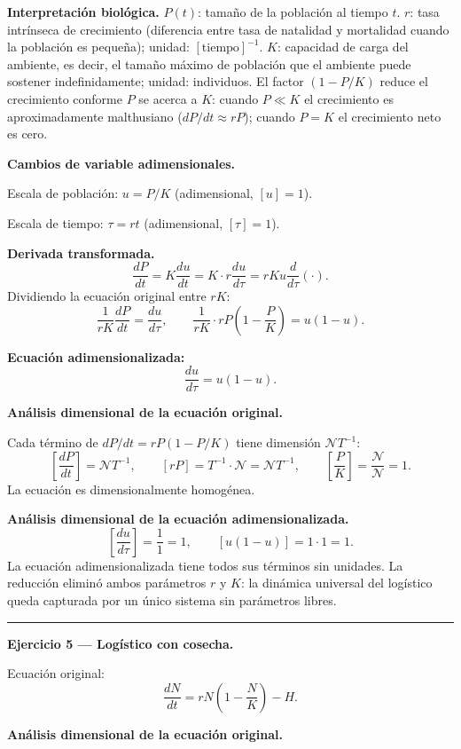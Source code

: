 \documentclass[12pt,letterpaper]{article}
\begin{document}
\textbf{Interpretación biológica.}
$P(t)$: tamaño de la población al tiempo $t$.
$r$: tasa intrínseca de crecimiento (diferencia entre tasa de natalidad y mortalidad
cuando la población es pequeña); unidad: $[\text{tiempo}]^{-1}$.
$K$: capacidad de carga del ambiente, es decir, el tamaño máximo de población
que el ambiente puede sostener indefinidamente; unidad: individuos.
El factor $(1-P/K)$ reduce el crecimiento conforme $P$ se acerca a $K$:
cuando $P\ll K$ el crecimiento es aproximadamente malthusiano ($dP/dt\approx rP$);
cuando $P=K$ el crecimiento neto es cero.

\textbf{Cambios de variable adimensionales.}

Escala de población: $u=P/K$ (adimensional, $[u]=1$).

Escala de tiempo: $\tau=rt$ (adimensional, $[\tau]=1$).

\textbf{Derivada transformada.}
\[
  \frac{dP}{dt}=K\frac{du}{dt}=K\cdot r\frac{du}{d\tau}=rKu\frac{d}{d\tau}(\cdot).
\]
Dividiendo la ecuación original entre $rK$:
\[
  \frac{1}{rK}\frac{dP}{dt}=\frac{du}{d\tau},\qquad
  \frac{1}{rK}\cdot rP\!\left(1-\frac{P}{K}\right)=u(1-u).
\]

\textbf{Ecuación adimensionalizada:}
\[
  \boxed{\frac{du}{d\tau}=u(1-u).}
\]

\textbf{Análisis dimensional de la ecuación original.}

Cada término de $dP/dt=rP(1-P/K)$ tiene dimensión $\mathcal{N}T^{-1}$:
\[
  \left[\frac{dP}{dt}\right]=\mathcal{N}T^{-1},\qquad
  [rP]=T^{-1}\cdot\mathcal{N}=\mathcal{N}T^{-1},\qquad
  \left[\frac{P}{K}\right]=\frac{\mathcal{N}}{\mathcal{N}}=1.
\]
La ecuación es dimensionalmente homogénea. \checkmark

\textbf{Análisis dimensional de la ecuación adimensionalizada.}
\[
  \left[\frac{du}{d\tau}\right]=\frac{1}{1}=1,\qquad [u(1-u)]=1\cdot 1=1.
\]
La ecuación adimensionalizada tiene todos sus términos sin unidades. \checkmark
La reducción eliminó ambos parámetros $r$ y $K$: la dinámica universal
del logístico queda capturada por un único sistema sin parámetros libres.

\bigskip
\noindent\rule{\textwidth}{0.3pt}
\bigskip

\noindent\textbf{Ejercicio 5 — Logístico con cosecha.}

Ecuación original:
\[
  \frac{dN}{dt}=rN\!\left(1-\frac{N}{K}\right)-H.
\]

\textbf{Análisis dimensional de la ecuación original.}
\end{document}
